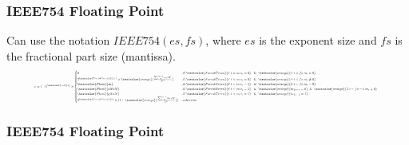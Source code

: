 \begin{frame}
    \frametitle{IEEE754 Floating Point}
    Can use the notation $IEEE754(es, fs)$, where $es$ is the exponent size and $fs$ is the fractional part size (mantissa).
\begin{equation}
    \resizebox{0.9\textwidth}{!}{%
    $
    \begin{aligned}
        x&=(-1)^{\textcolor{red}{s}} \times \begin{cases}
                0 &, \text{if } \textcolor{ForestGreen}{\forall\ i<es\ e_i=0}\ \And \textcolor{orange}{\forall\ i<fs\ m_i=0} \\
                2^{\textcolor{ForestGreen}{e}+1} \times \textcolor{orange}{\frac{\sum_{i=0}^{fs-1} m_i \times 2^i}{2^{fs}}} &, \text{if } \textcolor{ForestGreen}{\forall\ i<es\ e_i=0}\ \And \textcolor{orange}{\exists\ i<fs\ m_i\neq0} \\
                \textcolor{Plum}{\infty} &, \text{if } \textcolor{ForestGreen}{\forall\ i<es\ e_i=1}\ \And \textcolor{orange}{\forall\ i<fs\ m_i=0} \\
                 \textcolor{Plum}{sNaN} &, \text{if } \textcolor{ForestGreen}{\forall\ i<es\ e_i=1}\ \And \textcolor{orange}{m_{fs-1}=0} \And \textcolor{orange}{\exists\ i<fs-1\ m_i\neq0} \\
                 \textcolor{Plum}{qNaN} &, \text{if } \textcolor{ForestGreen}{\forall\ i<es\ e_i=1}\ \And \textcolor{orange}{m_{fs-1}=1} \\
                2^{\textcolor{ForestGreen}{e}} \times (1 + \textcolor{orange}{\frac{\sum_{i=0}^{fs-1} m_i \times 2^i}{2^{fs}}}) &, \text{otherwise}
        \end{cases}
    \end{aligned}$%
    }
\end{equation}

\end{frame}

\begin{frame}
    \frametitle{IEEE754 Floating Point}
\end{frame}


